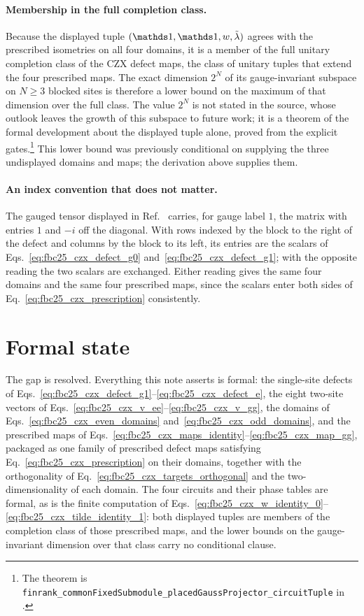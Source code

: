 \documentclass{article}
\begin{document}
\paragraph{Membership in the full completion class.}
Because the displayed tuple $(\Id,\Id,w,\tilde\lambda)$ agrees with the
prescribed isometries on all four domains, it is a member of the full unitary
completion class of the CZX defect maps, the class of unitary tuples that
extend the four prescribed maps. The exact dimension $2^N$ of its
gauge-invariant subspace on $N\geq3$ blocked sites is therefore a lower
bound on the maximum of that dimension over the full class. The value $2^N$
is not stated in the source, whose outlook
\cite[line~5198]{FrancoRubio2025MPUGauging} leaves the growth of this
subspace to future work; it is a theorem of the formal development about the
displayed tuple alone, proved from the explicit gates.\footnote{The theorem is
\texttt{finrank\_commonFixedSubmodule\_placedGaussProjector\_circuitTuple}
in .} This lower bound
was previously conditional on supplying the three undisplayed domains and
maps; the derivation above supplies them.

\paragraph{An index convention that does not matter.}
The gauged tensor displayed in
Ref.~\cite[lines~5131--5178]{FrancoRubio2025MPUGauging} carries, for gauge
label $1$, the matrix with entries $1$ and $-i$ off the diagonal. With rows
indexed by the block to the right of the defect and columns by the block to
its left, its entries are the scalars of
Eqs.~\ref{eq:fbc25_czx_defect_g0} and~\ref{eq:fbc25_czx_defect_g1}; with
the opposite reading the two scalars are exchanged. Either reading gives the
same four domains and the same four prescribed maps, since the scalars enter
both sides of Eq.~\ref{eq:fbc25_czx_prescription} consistently.

\section{Formal state}

The gap is resolved. Everything this note asserts is formal: the single-site
defects of Eqs.~\ref{eq:fbc25_czx_defect_g1}--\ref{eq:fbc25_czx_defect_e}, the
eight two-site vectors of
Eqs.~\ref{eq:fbc25_czx_v_ee}--\ref{eq:fbc25_czx_v_gg}, the domains of
Eqs.~\ref{eq:fbc25_czx_even_domains} and~\ref{eq:fbc25_czx_odd_domains}, and
the prescribed maps of
Eqs.~\ref{eq:fbc25_czx_maps_identity}--\ref{eq:fbc25_czx_map_gg}, packaged as
one family of prescribed defect maps satisfying
Eq.~\ref{eq:fbc25_czx_prescription} on their domains, together with the
orthogonality of Eq.~\ref{eq:fbc25_czx_targets_orthogonal} and the
two-dimensionality of each domain. The four circuits and their phase tables
are formal, as is the finite computation of
Eqs.~\ref{eq:fbc25_czx_w_identity_0}--\ref{eq:fbc25_czx_tilde_identity_1}: both
displayed tuples are members of the completion class of those prescribed maps,
and the lower bounds on the gauge-invariant dimension over that class carry no
conditional clause.
\end{document}
